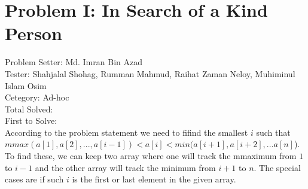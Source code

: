 \section*{Problem I: In Search of a Kind Person}
Problem Setter: Md. Imran Bin Azad \\
Tester: Shahjalal Shohag, Rumman Mahmud, Raihat Zaman Neloy, Muhiminul Islam Osim \\
Cetegory: Ad-hoc \\
Total Solved:  \\
First to Solve: \\

According to the problem statement we need to fifind the smallest $i$ such that
$mmax(a[1], a[2], ... , a[i-1]) < a[i] < min(a[i+1], a[i+2], ... a[n]$). To find
these, we can keep two array where one will track the mmaximum from $1$ to $i-1$
and the other array will track the minimum from $i+1$ to $n$. The special cases
are if such $i$ is the first or last element in the given array.